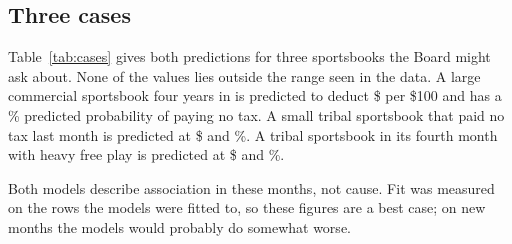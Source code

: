 \FloatBarrier
\subsection*{Three cases}

Table~\ref{tab:cases} gives both predictions for three sportsbooks the Board might ask about. None of the values lies outside the range seen in the data. A large commercial sportsbook four years in is predicted to deduct \$ per \$100 and has a \% predicted probability of paying no tax. A small tribal sportsbook that paid no tax last month is predicted at \$ and \%. A tribal sportsbook in its fourth month with heavy free play is predicted at \$ and \%.

\begin{table}[!htbp]
\centering
\caption{Scenario predictions from both models. Source: output/tables/model\_scenarios.}\label{tab:cases}
\resizebox{\linewidth}{!}{}
\end{table}

Both models describe association in these months, not cause. Fit was measured on the rows the models were fitted to, so these figures are a best case; on new months the models would probably do somewhat worse.
\FloatBarrier

